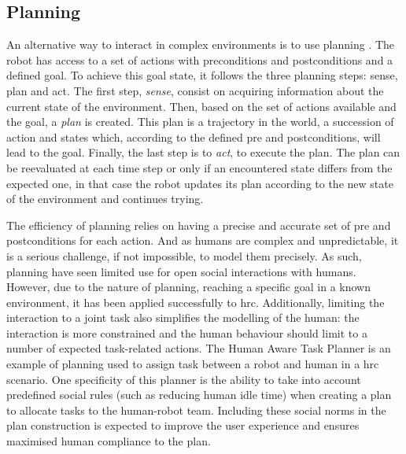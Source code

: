 \subsection{Planning} \label{ssec:planning}
    
    An alternative way to interact in complex environments is to use planning \citep{asada1986robot}. The robot has access to a set of actions with preconditions and postconditions and a defined goal. To achieve this goal state, it follows the three planning steps: sense, plan and act. The first step, \emph{sense}, consist on acquiring information about the current state of the environment. Then, based on the set of actions available and the goal, a \emph{plan} is created. This plan is a trajectory in the world, a succession of action and states which, according to the defined pre and postconditions, will lead to the goal. Finally, the last step is to \emph{act}, to execute the plan. The plan can be reevaluated at each time step or only if an encountered state differs from the expected one, in that case the robot updates its plan according to the new state of the environment and continues trying.
    
    
    The efficiency of planning relies on having a precise and accurate set of pre and postconditions for each action. And as humans are complex and unpredictable, it is a serious challenge, if not impossible, to model them precisely. As such, planning have seen limited use for open social interactions with humans. However, due to the nature of planning, reaching a specific goal in a known environment, it has been applied successfully to \gls{hrc}. Additionally, limiting the interaction to a joint task also simplifies the modelling of the human: the interaction is more constrained and the human behaviour should limit to a number of expected task-related actions. The Human Aware Task Planner \citep{alili2009task} is an example of planning used to assign task between a robot and human in a \gls{hrc} scenario. One specificity of this planner is the ability to take into account predefined social rules (such as reducing human idle time) when creating a plan to allocate tasks to the human-robot team. Including these social norms in the plan construction is expected to improve the user experience and ensures maximised human compliance to the plan.
    
